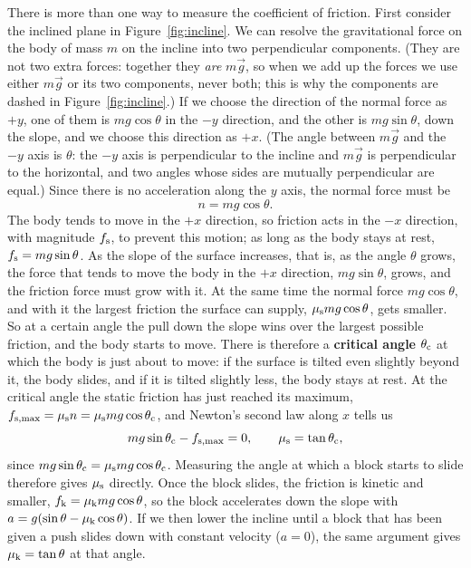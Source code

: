 \documentclass[11pt,a4paper]{article}
\begin{document}
There is more than one way to measure the coefficient of friction. First consider the inclined plane
in Figure~\ref{fig:incline}. We can resolve the gravitational force on the body of mass $m$ on the
incline into two perpendicular components. (They are not two extra forces: together they \emph{are}
$m\vec{g}$, so when we add up the forces we use either $m\vec{g}$ or its two components, never both;
this is why the components are dashed in Figure~\ref{fig:incline}.) If we choose the direction of the normal
force as $+y$, one of them is $mg\cos\theta$ in the $-y$ direction, and the other is $mg\sin\theta$,
down the slope, and we choose this direction as $+x$. (The angle between $m\vec{g}$ and the $-y$ axis
is $\theta$: the $-y$ axis is perpendicular to the incline and $m\vec{g}$ is perpendicular to the
horizontal, and two angles whose sides are mutually perpendicular are equal.) Since there is no
acceleration along the $y$ axis, the normal force must be
\begin{equation}\label{eq:n-incline}
  n = mg\cos\theta .
\end{equation}
The body tends to move in the $+x$ direction, so friction acts in the $-x$ direction, with magnitude
$f_{\mathrm{s}}$, to prevent this motion; as long as the body stays at rest, $f_{\mathrm{s}} = mg\sin\theta$. As the
slope of the surface increases, that is, as the angle $\theta$ grows, the force that tends to move the
body in the $+x$ direction, $mg\sin\theta$, grows, and the friction force must grow with it. At the
same time the normal force $mg\cos\theta$, and with it the largest friction the surface can supply,
$\mu_{\mathrm{s}} mg\cos\theta$, gets smaller. So at a certain angle the pull down the slope wins over the
largest possible friction, and the body starts to move. There is therefore a \textbf{critical angle}
$\theta_{\mathrm{c}}$ at which the body is just about to move: if the surface is tilted even slightly beyond
it, the body slides, and if it is tilted slightly less, the body stays at rest. At the critical angle
the static friction has just reached its maximum, $f_{\mathrm{s,max}} = \mu_{\mathrm{s}} n = \mu_{\mathrm{s}} mg\cos
\theta_{\mathrm{c}}$, and Newton's second law along $x$ tells us
\begin{equation}\label{eq:crit-angle}
  mg\sin\theta_{\mathrm{c}} - f_{\mathrm{s,max}} = 0 , \qquad \mu_{\mathrm{s}} = \tan\theta_{\mathrm{c}} ,
\end{equation}
since $mg\sin\theta_{\mathrm{c}} = \mu_{\mathrm{s}} mg\cos\theta_{\mathrm{c}}$. Measuring the angle at which a block
starts to slide therefore gives $\mu_{\mathrm{s}}$ directly. Once the block slides, the friction is kinetic
and smaller, $f_{\mathrm{k}} = \mu_{\mathrm{k}} mg\cos\theta$, so the block accelerates down the slope with
$a = g(\sin\theta - \mu_{\mathrm{k}}\cos\theta)$. If we then lower the incline until a block that has been
given a push slides down with constant velocity ($a = 0$), the same argument gives
$\mu_{\mathrm{k}} = \tan\theta$ at that angle.
\end{document}
